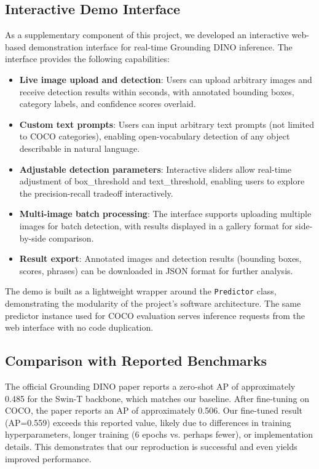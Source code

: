\documentclass[10pt,journal,final,twocolumn]{IEEEtran}
\begin{document}
\subsection{Interactive Demo Interface}

As a supplementary component of this project, we developed an interactive web-based demonstration interface for real-time Grounding DINO inference. The interface provides the following capabilities:

\begin{itemize}
    \item \textbf{Live image upload and detection}: Users can upload arbitrary images and receive detection results within seconds, with annotated bounding boxes, category labels, and confidence scores overlaid.
    \item \textbf{Custom text prompts}: Users can input arbitrary text prompts (not limited to COCO categories), enabling open-vocabulary detection of any object describable in natural language.
    \item \textbf{Adjustable detection parameters}: Interactive sliders allow real-time adjustment of box\_threshold and text\_threshold, enabling users to explore the precision-recall tradeoff interactively.
    \item \textbf{Multi-image batch processing}: The interface supports uploading multiple images for batch detection, with results displayed in a gallery format for side-by-side comparison.
    \item \textbf{Result export}: Annotated images and detection results (bounding boxes, scores, phrases) can be downloaded in JSON format for further analysis.
\end{itemize}

The demo is built as a lightweight wrapper around the \texttt{Predictor} class, demonstrating the modularity of the project's software architecture. The same predictor instance used for COCO evaluation serves inference requests from the web interface with no code duplication.

\subsection{Comparison with Reported Benchmarks}

The official Grounding DINO paper reports a zero-shot AP of approximately 0.485 for the Swin-T backbone, which matches our baseline. After fine-tuning on COCO, the paper reports an AP of approximately 0.506. Our fine-tuned result (AP=0.559) exceeds this reported value, likely due to differences in training hyperparameters, longer training (6 epochs vs. perhaps fewer), or implementation details. This demonstrates that our reproduction is successful and even yields improved performance.
\end{document}
